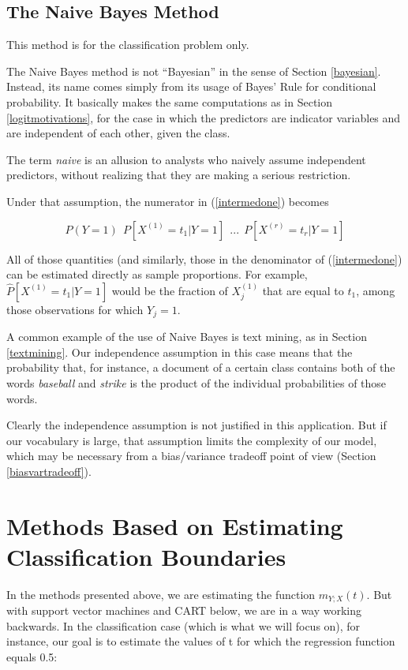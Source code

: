 \subsection{The Naive Bayes Method}

This method is for the classification problem only.

The Naive Bayes method is not ``Bayesian'' in the sense of Section
\ref{bayesian}.  Instead, its name comes simply from its usage of Bayes'
Rule for conditional probability.  It basically makes the same
computations as in Section \ref{logitmotivations}, for the case in which
the predictors are indicator variables and are independent of each
other, given the class.  

The term {\it naive} is an allusion to analysts who naively assume
independent predictors, without realizing that they are making a serious
restriction.

Under that assumption, the numerator in (\ref{intermedone}) becomes

\begin{equation}
P(Y = 1) ~~ P[X^{(1)}=t_1|Y=1]~~ ...~~ P[X^{(r)}=t_r|Y=1]
\end{equation}

All of those quantities (and similarly, those in the denominator of
(\ref{intermedone}) can be estimated directly as sample proportions.
For example, $\widehat{P}[X^{(1)}=t_1|Y=1]$ would be the fraction of
$X_j^{(1)}$ that are equal to $t_1$, among those observations for which
$Y_j = 1$.

A common example of the use of Naive Bayes is text mining, as in Section
\ref{textmining}.  Our independence assumption in this case means that
the probability that, for instance, a document of a certain class
contains both of the words {\it baseball} and {\it strike} is the
product of the individual probabilities of those words.

Clearly the independence assumption is not justified in this
application.  But if our vocabulary is large, that assumption limits the
complexity of our model, which may be necessary from a bias/variance
tradeoff point of view (Section \ref{biasvartradeoff}).  

\section{Methods Based on Estimating Classification Boundaries}

In the methods presented above, we are estimating the function
$m_{Y;X}(t)$.  But with support vector machines and CART below, we are
in a way working backwards.  In the classification case (which is what
we will focus on), for instance, our goal is to estimate the values of t
for which the regression function equals 0.5:


